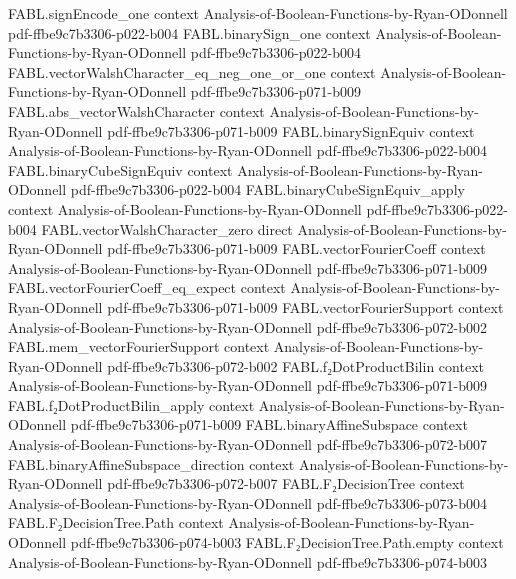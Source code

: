 \begin{theorem}
\proofstep
  {FABL.signEncode_one}
  {context}
  {Analysis-of-Boolean-Functions-by-Ryan-ODonnell}
  {pdf-ffbe9c7b3306-p022-b004}
\proofstep
  {FABL.binarySign_one}
  {context}
  {Analysis-of-Boolean-Functions-by-Ryan-ODonnell}
  {pdf-ffbe9c7b3306-p022-b004}
\proofstep
  {FABL.vectorWalshCharacter_eq_neg_one_or_one}
  {context}
  {Analysis-of-Boolean-Functions-by-Ryan-ODonnell}
  {pdf-ffbe9c7b3306-p071-b009}
\proofstep
  {FABL.abs_vectorWalshCharacter}
  {context}
  {Analysis-of-Boolean-Functions-by-Ryan-ODonnell}
  {pdf-ffbe9c7b3306-p071-b009}
\proofstep
  {FABL.binarySignEquiv}
  {context}
  {Analysis-of-Boolean-Functions-by-Ryan-ODonnell}
  {pdf-ffbe9c7b3306-p022-b004}
\proofstep
  {FABL.binaryCubeSignEquiv}
  {context}
  {Analysis-of-Boolean-Functions-by-Ryan-ODonnell}
  {pdf-ffbe9c7b3306-p022-b004}
\proofstep
  {FABL.binaryCubeSignEquiv_apply}
  {context}
  {Analysis-of-Boolean-Functions-by-Ryan-ODonnell}
  {pdf-ffbe9c7b3306-p022-b004}
\proofstep
  {FABL.vectorWalshCharacter_zero}
  {direct}
  {Analysis-of-Boolean-Functions-by-Ryan-ODonnell}
  {pdf-ffbe9c7b3306-p071-b009}
\proofstep
  {FABL.vectorFourierCoeff}
  {context}
  {Analysis-of-Boolean-Functions-by-Ryan-ODonnell}
  {pdf-ffbe9c7b3306-p071-b009}
\proofstep
  {FABL.vectorFourierCoeff_eq_expect}
  {context}
  {Analysis-of-Boolean-Functions-by-Ryan-ODonnell}
  {pdf-ffbe9c7b3306-p071-b009}
\proofstep
  {FABL.vectorFourierSupport}
  {context}
  {Analysis-of-Boolean-Functions-by-Ryan-ODonnell}
  {pdf-ffbe9c7b3306-p072-b002}
\proofstep
  {FABL.mem_vectorFourierSupport}
  {context}
  {Analysis-of-Boolean-Functions-by-Ryan-ODonnell}
  {pdf-ffbe9c7b3306-p072-b002}
\proofstep
  {FABL.f₂DotProductBilin}
  {context}
  {Analysis-of-Boolean-Functions-by-Ryan-ODonnell}
  {pdf-ffbe9c7b3306-p071-b009}
\proofstep
  {FABL.f₂DotProductBilin_apply}
  {context}
  {Analysis-of-Boolean-Functions-by-Ryan-ODonnell}
  {pdf-ffbe9c7b3306-p071-b009}
\proofstep
  {FABL.binaryAffineSubspace}
  {context}
  {Analysis-of-Boolean-Functions-by-Ryan-ODonnell}
  {pdf-ffbe9c7b3306-p072-b007}
\proofstep
  {FABL.binaryAffineSubspace_direction}
  {context}
  {Analysis-of-Boolean-Functions-by-Ryan-ODonnell}
  {pdf-ffbe9c7b3306-p072-b007}
\proofstep
  {FABL.F₂DecisionTree}
  {context}
  {Analysis-of-Boolean-Functions-by-Ryan-ODonnell}
  {pdf-ffbe9c7b3306-p073-b004}
\proofstep
  {FABL.F₂DecisionTree.Path}
  {context}
  {Analysis-of-Boolean-Functions-by-Ryan-ODonnell}
  {pdf-ffbe9c7b3306-p074-b003}
\proofstep
  {FABL.F₂DecisionTree.Path.empty}
  {context}
  {Analysis-of-Boolean-Functions-by-Ryan-ODonnell}
  {pdf-ffbe9c7b3306-p074-b003}
\proofstep

\end{theorem}
